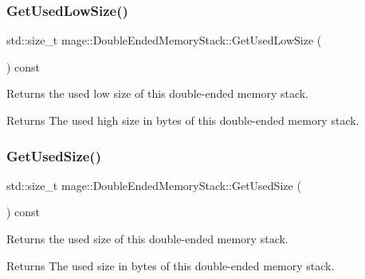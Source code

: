 \subsubsection{\texorpdfstring{Get\+Used\+Low\+Size()}{GetUsedLowSize()}}
{\footnotesize\ttfamily std\+::size\+\_\+t mage\+::\+Double\+Ended\+Memory\+Stack\+::\+Get\+Used\+Low\+Size (\begin{DoxyParamCaption}{ }\end{DoxyParamCaption}) const\hspace{0.3cm}{\ttfamily [noexcept]}}

Returns the used low size of this double-\/ended memory stack.

\begin{DoxyReturn}{Returns}
The used high size in bytes of this double-\/ended memory stack. 
\end{DoxyReturn}
\mbox{\label{classmage_1_1_double_ended_memory_stack_afdbfe299c744ef2c363aec40929b6be2}} 
\subsubsection{\texorpdfstring{Get\+Used\+Size()}{GetUsedSize()}}
{\footnotesize\ttfamily std\+::size\+\_\+t mage\+::\+Double\+Ended\+Memory\+Stack\+::\+Get\+Used\+Size (\begin{DoxyParamCaption}{ }\end{DoxyParamCaption}) const\hspace{0.3cm}{\ttfamily [noexcept]}}

Returns the used size of this double-\/ended memory stack.

\begin{DoxyReturn}{Returns}
The used size in bytes of this double-\/ended memory stack. 
\end{DoxyReturn}
\mbox{\label{classmage_1_1_double_ended_memory_stack_aafcc4b3cd8d87d75cc3de53994b6ef7e}} 
